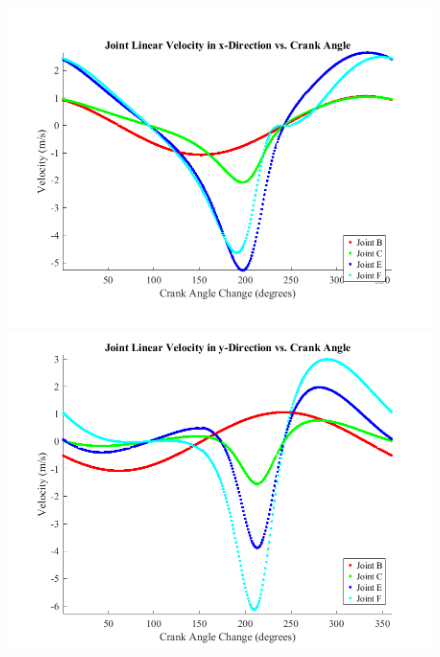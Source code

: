 \documentclass[12pt]{article}
\begin{document}
\begin{figure}[ht]
  \centering
  \includegraphics[scale=0.5]{../matlab-plots/linJointVelX.png}%
  \includegraphics[scale=0.5]{../matlab-plots/linJointVelY.png}\\


\end{figure}
\end{document}
